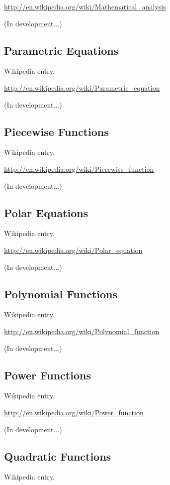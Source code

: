 \documentclass[12pt,twoside]{book}
\begin{document}
\href{http://en.wikipedia.org/wiki/Mathematical_analysis}{http://en.wikipedia.org/wiki/Mathematical\_analysis}

(In development...)

\subsection[Parametric Equations]{Parametric
Equations}
Wikipedia entry.

\href{http://en.wikipedia.org/wiki/Parametric_equation}{http://en.wikipedia.org/wiki/Parametric\_equation}

(In development...)

\subsection[Piecewise Functions]{Piecewise
Functions}
Wikipedia entry.

\href{http://en.wikipedia.org/wiki/Piecewise_function}{http://en.wikipedia.org/wiki/Piecewise\_function}

(In development...)

\subsection[Polar Equations]{Polar Equations}
Wikipedia entry.

\href{http://en.wikipedia.org/wiki/Polar_equation}{http://en.wikipedia.org/wiki/Polar\_equation}

(In development...)

\subsection[Polynomial Functions]{Polynomial
Functions}
Wikipedia entry.

\href{http://en.wikipedia.org/wiki/Polynomial_function}{http://en.wikipedia.org/wiki/Polynomial\_function}

(In development...)

\subsection[Power Functions]{Power Functions}
Wikipedia entry.

\href{http://en.wikipedia.org/wiki/Power_function}{http://en.wikipedia.org/wiki/Power\_function}

(In development...)

\subsection[Quadratic Functions]{Quadratic
Functions}
Wikipedia entry.
\end{document}
